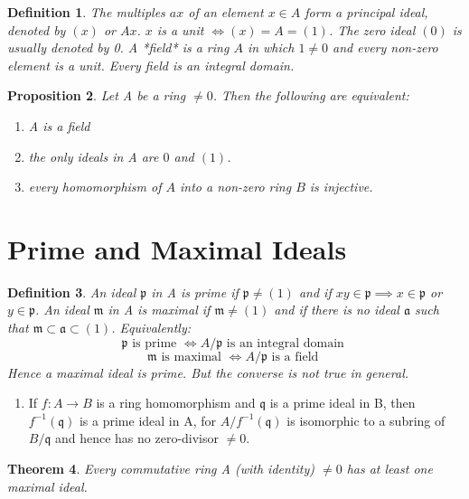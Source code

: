 \documentclass[]{report}
\newtheorem{theorem}{Theorem}[section]
\newtheorem{prop}[theorem]{Proposition}
\newtheorem{defn}[theorem]{Definition}
\begin{document}
\begin{defn}
    The multiples $ax$ of an element $x\in A$ form a principal ideal, denoted by $(x)$ or $Ax$. $x$ is a unit $\Leftrightarrow (x) = A = (1)$. The zero ideal $(0)$ is usually denoted by 0. A *field* is a ring $A$ in which $1\neq 0$ and every non-zero element is a unit. Every field is an integral domain. 
\end{defn}

\begin{prop}
    Let A be a ring $\neq 0$. Then the following are equivalent:
    \begin{enumerate}
        \item A is a field
        \item the only ideals in A are $0$ and $(1)$.
        \item every homomorphism of $A$ into a non-zero ring $B$ is injective.
    \end{enumerate}
\end{prop}

\section{Prime and Maximal Ideals}

\begin{defn}
    An ideal $\mathfrak{p}$ in A is prime if $\mathfrak{p}\neq (1)$ and if $xy\in \mathfrak{p} \implies x \in \mathfrak{p}$ or $y \in \mathfrak{p}$.
An ideal $\mathfrak{m}$ in A is maximal if $\mathfrak{m} \neq (1)$ and if there is no ideal $\mathfrak{a}$ such that $\mathfrak{m\subset a\subset} (1)$. Equivalently:
$$\mathfrak{p} \text{ is prime } \Leftrightarrow A/\mathfrak{p} \text{ is an integral domain }$$
$$\mathfrak{m} \text{ is maximal } \Leftrightarrow A/\mathfrak{p} \text{ is a field }$$
Hence a maximal ideal is prime. But the converse is not true in general. 
\end{defn}

\begin{enumerate} 
    \item If $f: A \rightarrow B$ is a ring homomorphism and $\mathfrak{q}$ is a prime ideal in B, then $f^{-1}(\mathfrak{q})$ is a prime ideal in A, for $A/f^{-1}(\mathfrak{q})$ is isomorphic to a subring of $B/\mathfrak{q}$ and hence has no zero-divisor $\neq 0$. 
\end{enumerate}

\begin{theorem}
    Every commutative ring A (with identity) $\neq 0$ has at least one maximal ideal.
\end{theorem}
\end{document}
